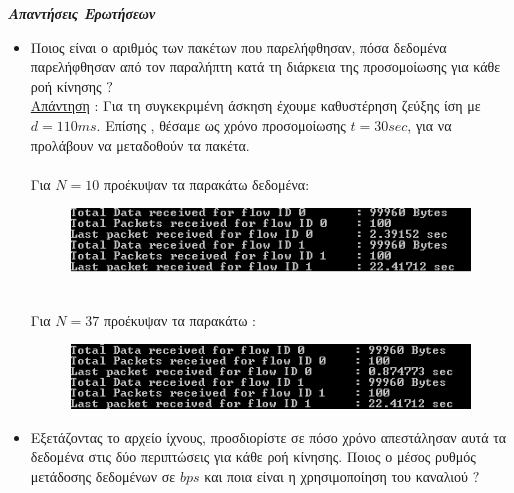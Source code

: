 \documentclass{article}%
\begin{document}
\textbf{\textsl{Απαντήσεις Ερωτήσεων}}
\begin{itemize}
\item Ποιος είναι ο αριθμός των πακέτων που παρελήφθησαν, πόσα δεδομένα παρελήφθησαν από τον
παραλήπτη κατά τη διάρκεια της προσομοίωσης για κάθε ροή κίνησης $?$\\
\underline{Απάντηση} : Για τη συγκεκριμένη άσκηση έχουμε καθυστέρηση ζεύξης ίση με $d=110ms$. Επίσης , θέσαμε ως χρόνο προσομοίωσης $t=30sec$, για να προλάβουν να μεταδοθούν τα πακέτα.\\\\
Για $N=10$ προέκυψαν τα παρακάτω δεδομένα:
\begin{figure}[htbp]
	\centering
		\includegraphics[width=1.00\textwidth]{5.png}
	\label{fig:5}
\end{figure}\\
Για $N=37$ προέκυψαν τα παρακάτω :
\begin{figure}[htbp]
	\centering
		\includegraphics[width=1.00\textwidth]{4.png}
	\label{fig:4}
\end{figure}
\item Εξετάζοντας το αρχείο ίχνους, προσδιορίστε σε πόσο χρόνο απεστάλησαν αυτά τα δεδομένα στις
δύο περιπτώσεις για κάθε ροή κίνησης. Ποιος ο μέσος ρυθμός μετάδοσης δεδομένων σε $bps$ και
ποια είναι η χρησιμοποίηση του καναλιού $?$\\


\end{itemize}
\end{document}
